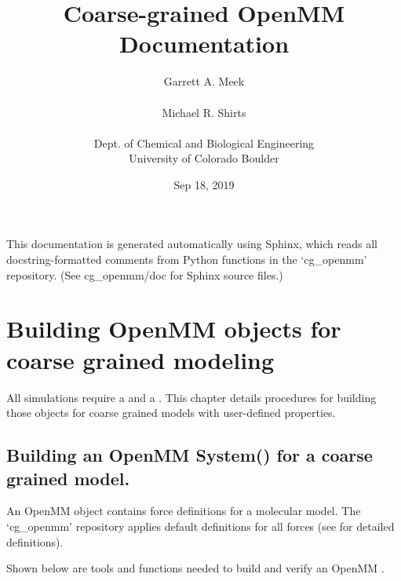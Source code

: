 \documentclass[letterpaper,12pt,english,openany,oneside]{sphinxmanual}
\title{Coarse-grained OpenMM Documentation}
\date{Sep 18, 2019}
\author{Garrett A. Meek\\ \\Michael R. Shirts\\ \\Dept. of Chemical and Biological Engineering\\University of Colorado Boulder}
\begin{document}
\pagestyle{empty}
\sphinxmaketitle
\pagestyle{plain}
\sphinxtableofcontents
\pagestyle{normal}
\label{\detokenize{index::doc}}


This documentation is generated automatically using Sphinx, which reads all docstring-formatted comments from Python functions in the ‘cg\_openmm’ repository.  (See cg\_openmm/doc for Sphinx source files.)


\chapter{Building OpenMM objects for coarse grained modeling}
\label{\detokenize{build:building-openmm-objects-for-coarse-grained-modeling}}\label{\detokenize{build::doc}}
All  simulations require a  and a .  This chapter details procedures for building those objects for coarse grained models with user-defined properties.


\section{Building an OpenMM System() for a coarse grained model.}
\label{\detokenize{build:building-an-openmm-system-for-a-coarse-grained-model}}
An OpenMM  object contains force definitions for a molecular model.  The ‘cg\_openmm’ repository applies default definitions for all forces (see  for detailed definitions).

Shown below are tools and functions needed to build and verify an OpenMM  .

\label{\detokenize{build:module-build.cg_build}}
\end{document}

